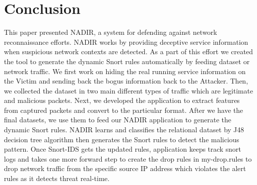 \section{Conclusion}
\label{conclusion}

This paper presented NADIR, a system for defending against network reconnaissance efforts. NADIR works by providing deceptive service information when suspicious network contexts are detected. As a part of this effort we created the tool to generate the dynamic Snort rules automatically by feeding dataset or network traffic. We first work on hiding the real running service information on the Victim and sending back the bogus information back to the Attacker. Then, we collected the dataset in two main different types of traffic which are legitimate and malicious packets. Next, we developed the application to extract features from captured packets and convert to the particular format. After we have the final datasets, we use them to feed our NADIR application to generate the dynamic Snort rules. NADIR learns and classifies the relational dataset by J48 decision tree algorithm then generates the Snort rules to detect the malicious pattern. Once Snort-IDS gets the updated rules, application keeps track snort logs and takes one more forward step to create the drop rules in my-drop.rules to drop network traffic from the specific source IP address which violates the alert rules as it detects threat real-time. 

